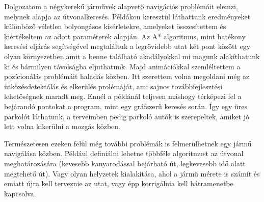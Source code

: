

Dolgozatom a négykerekű járművek alapvető navigációs problémáit elemzi, melynek alapja az útvonalkeresés. Példákon keresztül láthattunk eredményeket különböző véletlen bolyongásos kísérletekre, amelyeket összesítettem és kiértékeltem az adott paraméterek alapján. Az A* algoritmus, mint hatékony keresési eljárás segítségével megtaláltuk a legrövidebb utat két pont között egy olyan környezetben,amit a benne található akadályokkal mi magunk alakíthatunk ki és bármilyen távolságba eljuthatunk. Majd animációkkal szemléltettem a pozícionálás problémáit haladás közben. Itt szerettem volna megoldani még az ütközésdetektálás és elkerülés prolémáját, ami sajnos továbbfejlesztési lehetőségnek maradt meg. Ennél a példánál teljesen máshogy térképezi fel a bejárandó pontokat a program, mint egy gráfszerű keresés során. Így egy üres parkolót láthatunk, a terveimben pedig parkoló autók is szerepeltek, amiket jó lett volna kikerülni a mozgás közben.

Természetesen ezeken felül még további problémák is felmerülhetnek egy jármű navigálása közben. Például definiálni lehetne többféle algoritmust az útvonal meghatározására (kevesebb kanyarodással bejárható út, legkevesebb idő alatt megtehető út). Vagy olyan helyzetek kialakítása, ahol a jármű mérete is számít és emiatt újra kell terveznie az utat, vagy épp korrigálnia kell hátramenetbe kapcsolva.


